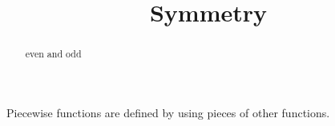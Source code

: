 \documentclass{ximera}
\title{Symmetry}
\begin{document}
\begin{abstract}
even and odd
\end{abstract}
\maketitle



Piecewise functions are defined by using pieces of other functions.
\end{document}
